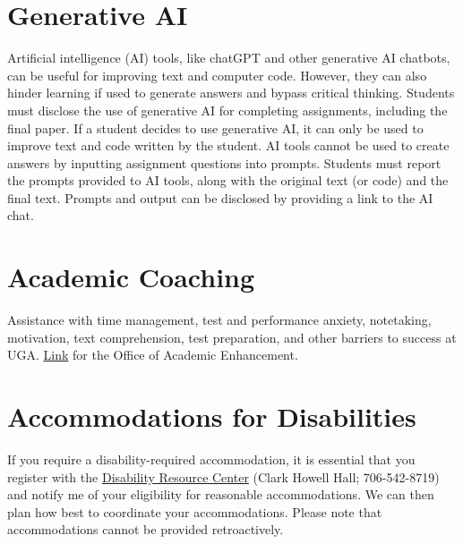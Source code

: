 \documentclass[12pt]{article}
\begin{document}
\section*{\normalsize Generative AI}

Artificial intelligence (AI) tools, like chatGPT and other generative AI
chatbots, can be useful for improving text and computer code. However,
they can also hinder learning if used to generate answers and bypass
critical thinking. Students must disclose the use of generative AI for
completing assignments, including the final paper. If a
student decides to use generative AI, it can only be used to improve
text and code written by the student. AI tools cannot be used to create
answers by inputting assignment questions into prompts. Students
must report the prompts provided to AI tools, along with the original
text (or code) and the final text. Prompts and output can be disclosed
by providing a link to the AI chat.



\section*{\normalsize Academic Coaching}

Assistance with time management, test and performance anxiety,
notetaking, motivation, text comprehension, test preparation, and
other barriers to success at
UGA. \href{https://dae.uga.edu/services/academic-coaching/}{\color{blue}
  Link} for the Office of Academic Enhancement. 

\section*{\normalsize Accommodations for Disabilities}

If you require a disability-required accommodation, it is essential
that you register with the \href{https://drc.uga.edu}{Disability Resource Center} (Clark Howell
Hall; 706-542-8719)
and notify me of your eligibility for reasonable accommodations. We
can then plan how best to coordinate your accommodations. Please note
that accommodations cannot be provided retroactively.
\end{document}
